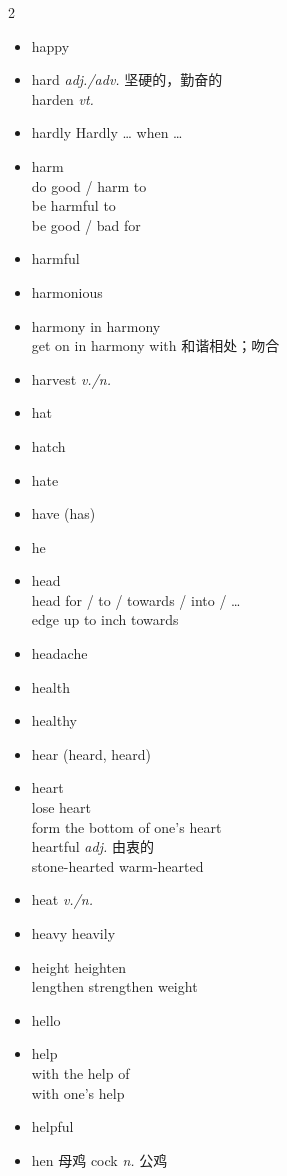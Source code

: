 \documentclass[../../book.tex]{subfiles}
\begin{document}
\begin{multicols}{2}
\begin{itemize}
\item[-] happy
\item[-] hard \emph{adj./adv.} 坚硬的，勤奋的
\\harden \emph{vt.}
\item[-] hardly \phantom{a} Hardly \ldots{} when \ldots
\item[-] harm
\\do good / harm to
\\be harmful to
\\be good / bad for
\item[-] harmful
\item[-] harmonious
\item[-] harmony \phantom{a} in harmony
\\get on in harmony with 和谐相处；吻合
\item[-] harvest \emph{v./n.}
\item[-] hat
\item[-] hatch
\item[-] hate
\item[-] have (has)
\item[-] he
\item[-] head
\\head for / to / towards / into / \ldots
\\{\color{violet}edge up to \phantom{a} inch towards}
\item[-] headache
\item[-] health
\item[-] healthy
\item[-] hear (heard, heard)
\item[-] heart
\\lose heart
\\form the bottom of one\textquoteright s heart
\\heartful \emph{adj.} 由衷的
\\stone-hearted warm-hearted
\item[-] heat \emph{v./n.}
\item[-] heavy \phantom{a} heavily
\item[-] height \phantom{a} heighten
\\{\color{violet}lengthen strengthen weight}
\item[-] hello
\item[-] help
\\with the help of
\\with one\textquoteright s help
\item[-] helpful
\item[-] hen 母鸡 \phantom{a} cock \emph{n.} 公鸡

\end{itemize}
\end{multicols}
\end{document}
